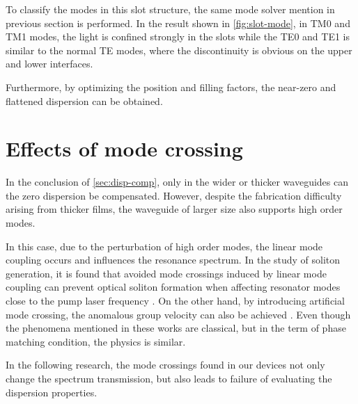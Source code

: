 To classify the modes in this slot structure, the same mode solver mention in previous section is performed.
In the result shown in \autoref{fig:slot-mode}, in TM0 and TM1 modes, the light is confined strongly in the slots while the TE0 and TE1 is similar to the normal TE modes, where the discontinuity is obvious on the upper and lower interfaces.




Furthermore, by optimizing the position and filling factors, the near-zero and flattened dispersion can be obtained. 


\section{Effects of mode crossing}

In the conclusion of \autoref{sec:disp-comp},
only in the wider or thicker waveguides can the zero dispersion be compensated. However, 
despite the fabrication difficulty arising from thicker films,
the waveguide of larger size also supports high order modes. 

In this case, due to the perturbation of high order modes, the linear mode coupling occurs and influences the resonance spectrum. 
In the study of soliton generation,
it is found that avoided mode crossings induced by linear mode coupling can prevent optical soliton formation when affecting resonator modes close to the pump laser frequency \cites{Herr2014a,Bao2018}. On the other hand, by introducing artificial mode crossing, the anomalous group velocity can also be achieved \cite{Kim2017}. Even though the phenomena mentioned in these works are classical, but in the term of phase matching condition, the physics is similar.

In the following research, the mode crossings found in our devices not only change the spectrum transmission, but also leads to failure of evaluating the dispersion properties.


